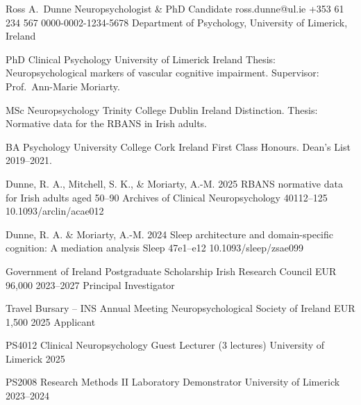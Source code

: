 \documentclass[palette=slate, layout=onecol]{rosscv}
\begin{document}
\cvheader
  {Ross A.\ Dunne}
  {Neuropsychologist \& PhD Candidate}
  {ross.dunne@ul.ie}
  {+353 61 234 567}
  {0000-0002-1234-5678}
  {Department of Psychology, University of Limerick, Ireland}


  {PhD Clinical Psychology}
  {University of Limerick}
  {Ireland}
  {Thesis: Neuropsychological markers of vascular cognitive impairment.
   Supervisor: Prof.\ Ann-Marie Moriarty.}

  {MSc Neuropsychology}
  {Trinity College Dublin}
  {Ireland}
  {Distinction. Thesis: Normative data for the RBANS in Irish adults.}

  {BA Psychology}
  {University College Cork}
  {Ireland}
  {First Class Honours. Dean's List 2019--2021.}


\publication
  {Dunne, R. A., Mitchell, S. K., \& Moriarty, A.-M.}
  {2025}
  {RBANS normative data for Irish adults aged 50--90}
  {Archives of Clinical Neuropsychology}
  {40}{112--125}
  {10.1093/arclin/acae012}

\publication
  {Dunne, R. A. \& Moriarty, A.-M.}
  {2024}
  {Sleep architecture and domain-specific cognition: A mediation analysis}
  {Sleep}
  {47}{e1--e12}
  {10.1093/sleep/zsae099}


\grant
  {Government of Ireland Postgraduate Scholarship}
  {Irish Research Council}
  {EUR 96,000}
  {2023--2027}
  {Principal Investigator}

\grant
  {Travel Bursary -- INS Annual Meeting}
  {Neuropsychological Society of Ireland}
  {EUR 1,500}
  {2025}
  {Applicant}


\teachingentry
  {PS4012 Clinical Neuropsychology}
  {Guest Lecturer (3 lectures)}
  {University of Limerick}
  {2025}

\teachingentry
  {PS2008 Research Methods II}
  {Laboratory Demonstrator}
  {University of Limerick}
  {2023--2024}

\end{document}

